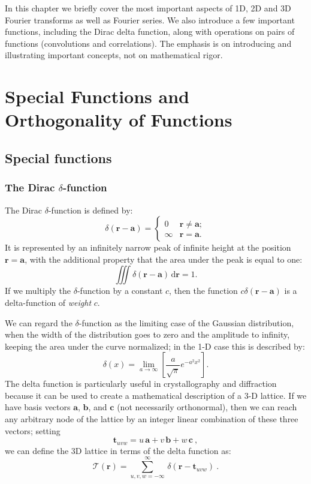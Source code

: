 In this chapter we briefly cover the most important aspects of 1D, 2D and 3D Fourier transforms as well as Fourier series.  We also introduce a few important functions, including the Dirac delta function, along with operations on pairs of functions (convolutions and correlations).  The emphasis is on introducing and illustrating important concepts, not on mathematical rigor.  

\section{Special Functions and Orthogonality of Functions}\label{\chabbr:sec:SpecFunc}

\subsection{Special functions}\label{\chabbr:ssec:special}

\subsubsection{The Dirac $\delta$-function}

The Dirac $\delta$-function is defined by:
\begin{equation}
	\delta(\mathbf{r}-\mathbf{a})=\left\{
	\begin{array}{ll}
		0      & \mathbf{r}\ne\mathbf{a}; \\
		\infty & \mathbf{r}=\mathbf{a}.
	\end{array}\right.
\end{equation}
It is represented by an infinitely narrow peak of infinite height at the position $\mathbf{r}=\mathbf{a}$, with the additional property that the area under the peak is equal to one:
\begin{equation}
	\iiint\delta(\mathbf{r}-\mathbf{a})
	\,\mathrm{d}\mathbf{r}=1.
\end{equation}
If we multiply the $\delta$-function by a constant $c$, then the function $c\delta(\mathbf{r}-\mathbf{a})$ is a delta-function of \textit{weight} $c$.  

We can regard the $\delta$-function as the limiting case of the Gaussian distribution, when the width of the distribution goes to zero and the amplitude to infinity, keeping the area under the curve normalized;  in the 1-D case this is described by:
\begin{equation}
	\delta(x)=\lim_{a\rightarrow\infty}\left[\frac{a}{\sqrt{\pi}} 
	e^{-a^{2}x^{2}}\right].
\end{equation}
The delta function is particularly useful in crystallography and diffraction because it can be used to create a mathematical description of a 3-D lattice.  If we have basis vectors $\mathbf{a}$, $\mathbf{b}$, and $\mathbf{c}$ (not necessarily orthonormal), then we can reach any arbitrary node of the lattice by an integer linear combination of these three vectors; setting 
\[
	\mathbf{t}_{uvw}= u\,\mathbf{a} +v\,\mathbf{b} +w\,\mathbf{c}\ ,
\]
we can define the 3D lattice in terms of the delta function as:
\[
	\mathcal{T}(\mathbf{r}) = \sum_{u,v,w=-\infty}^{\infty}\, \delta(\mathbf{r}-\mathbf{t}_{uvw})\ .
\]

